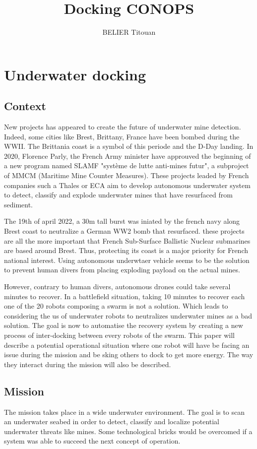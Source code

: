 \documentclass[twocolumn]{article}
\title{Docking CONOPS}
\author{BELIER Titouan}
\begin{document}
\maketitle
\section{Underwater docking}
\subsection{Context}
New projects has appeared to create the future of underwater mine detection. Indeed, some cities like Brest, Brittany, France have been bombed during the WWII. The Brittania coast is a symbol of this periode and the D-Day landing. In 2020, Florence Parly, the French Army minister have approuved the beginning of a new program named SLAMF "système de lutte anti-mines futur", a subproject of MMCM (Maritime Mine Counter Measures). These projects leaded by French companies such a Thales or ECA aim to develop autonomous underwater system to detect, classify and explode underwater mines that have resurfaced from sediment.

The 19th of april 2022, a 30m tall burst was iniated by the french navy along Brest coast to neutralize a German WW2 bomb that resurfaced. these projects are all the more important that French Sub-Surface Ballistic Nuclear submarines are based around Brest. Thus, protecting its coast is a major priority for French national interest. Using autonomous underwtaer vehicle seems to be the solution to prevent human divers from placing exploding payload on the actual mines.

However, contrary to human divers, autonomous drones could take several minutes to recover. In a battlefield situation, taking 10 minutes to recover each one of the 20 robots composing a swarm is not a solution. Which leads to considering the us of underwater robots to neutralizes underwater mines as a bad solution. The goal is now to automatise the recovery system by creating a new process of inter-docking between every robots of the swarm. This paper will describe a potential operational situation where one robot will have be facing an issue during the mission and be sking others to dock to get more energy. The way they interact during the mission will also be described.

\subsection{Mission}
The mission takes place in a wide underwater environment. The goal is to scan an underwater seabed in order to detect, classify and localize potential underwater threats like mines. Some technological bricks would be overcomed if a system was able to succeed the next concept of operation.
\end{document}
